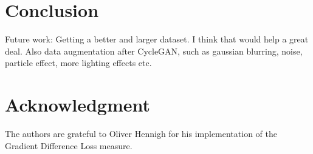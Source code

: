 \section{Conclusion}

Future work: Getting a better and larger dataset. I think that would help a great deal. Also data augmentation
after CycleGAN, such as gaussian blurring, noise, particle effect, more lighting effects etc.

\section*{Acknowledgment}
The authors are grateful to Oliver Hennigh for his implementation of the Gradient Difference Loss measure.